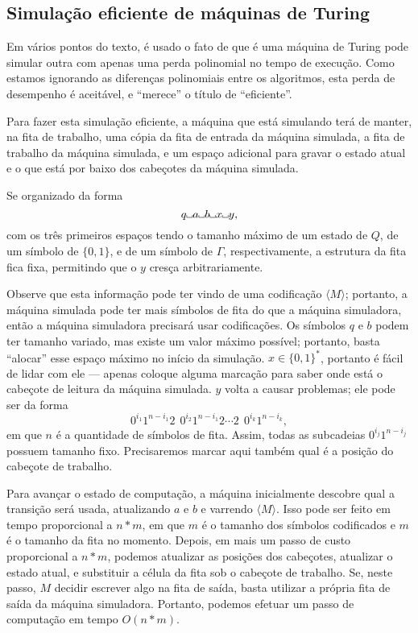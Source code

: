 \subsection{Simulação eficiente de máquinas de Turing}

Em vários pontos do texto,
é usado o fato de que é uma máquina de Turing pode simular outra
com apenas uma perda polinomial no tempo de execução.
Como estamos ignorando as diferenças polinomiais entre os algoritmos,
esta perda de desempenho é aceitável,
e ``merece'' o título de ``eficiente''.

Para fazer esta simulação eficiente,
a máquina que está simulando terá de manter, na fita de trabalho,
uma cópia da fita de entrada da máquina simulada,
a fita de trabalho da máquina simulada,
e um espaço adicional para gravar o estado atual
e o que está por baixo dos cabeçotes da máquina simulada.

Se organizado da forma
\begin{equation*}
    q \B a \B b \B x \B y,
\end{equation*}
com os três primeiros espaços tendo o tamanho máximo de um estado de $Q$,
de um símbolo de $\{0, 1\}$, e de um símbolo de $\Gamma$,
respectivamente,
a estrutura da fita fica fixa,
permitindo que o $y$ cresça arbitrariamente.

Observe que esta informação pode ter vindo de uma codificação $\langle M \rangle$;
portanto, a máquina simulada pode ter mais símbolos de fita
do que a máquina simuladora,
então a máquina simuladora precisará usar codificações.
Os símbolos $q$ e $b$ podem ter tamanho variado,
mas existe um valor máximo possível;
portanto, basta ``alocar'' esse espaço máximo no início da simulação.
$x \in \{0, 1\}^*$, portanto é fácil de lidar com ele
--- apenas coloque alguma marcação para saber onde está o cabeçote de leitura
da máquina simulada.
$y$ volta a causar problemas;
ele pode ser da forma
\begin{equation*}
    0^{i_1} 1^{n-i_1} 2\ \ 0^{i_2} 1^{n-i_1} 2 \cdots 2\ \ 0^{i_k} 1^{n-i_k},
\end{equation*}
em que $n$ é a quantidade de símbolos de fita.
Assim, todas as subcadeias $0^{i_j} 1^{n-i_j}$ possuem tamanho fixo.
Precisaremos marcar aqui também qual é a posição do cabeçote de trabalho.

Para avançar o estado de computação,
a máquina inicialmente descobre qual a transição será usada,
atualizando $a$ e $b$
e varrendo $\langle M \rangle$.
Isso pode ser feito em tempo proporcional a $n*m$,
em que $m$ é o tamanho dos símbolos codificados
e $m$ é o tamanho da fita no momento.
Depois,
em mais um passo de custo proporcional a $n*m$,
podemos atualizar as posições dos cabeçotes,
atualizar o estado atual,
e substituir a célula da fita sob o cabeçote de trabalho.
Se, neste passo,
$M$ decidir escrever algo na fita de saída,
basta utilizar a própria fita de saída da máquina simuladora.
Portanto, podemos efetuar um passo de computação em tempo $O(n * m)$.

